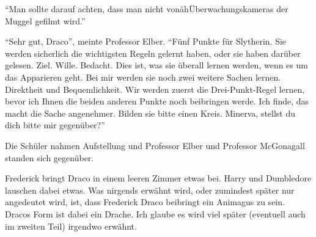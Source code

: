 \enquote{Man sollte darauf achten, dass man nicht von\abs äh\abs Überwachungskameras der Muggel gefilmt wird.}

\enquote{Sehr gut, Draco}, meinte Professor Elber. \enquote{Fünf Punkte für Slytherin. \gst Sie werden sicherlich die wichtigsten Regeln gelernt haben, oder sie haben darüber gelesen. \gst Ziel. Wille. Bedacht. \gst Dies ist, was sie überall lernen werden, wenn es um das Apparieren geht. \gst Bei mir werden sie noch zwei weitere Sachen lernen. \gst Direktheit und Bequemlichkeit. \gst Wir werden zuerst die Drei-Punkt-Regel lernen, bevor ich Ihnen die beiden anderen Punkte noch beibringen werde. Ich finde, das macht die Sache angenehmer. Bilden sie bitte einen Kreis. Minerva, stellst du dich bitte mir gegenüber?}

Die Schüler nahmen Aufstellung und Professor Elber und Professor McGonagall standen sich gegenüber.




\begin{kommentar}
Frederick bringt Draco in einem leeren Zimmer etwas bei. Harry und Dumbledore lauschen dabei etwas. Was nirgends erwähnt wird, oder zumindest später nur angedeutet wird, ist, dass Frederick Draco beibringt ein Animagus zu sein. Dracos Form ist dabei ein Drache. Ich glaube es wird viel später (eventuell auch im zweiten Teil) irgendwo erwähnt.
\end{kommentar}
